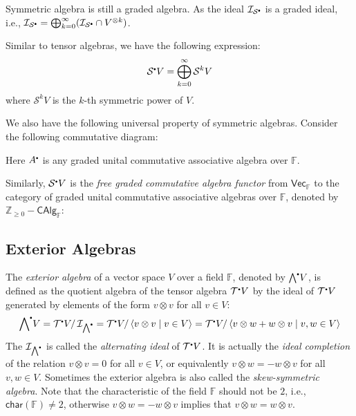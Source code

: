 \documentclass[
	11pt, %
	fleqn, %
	a4paper, %
]{LegrandOrangeBook}
\newcommand{\smallbullet}{\scalebox{0.5}{$\bullet$}}
\renewcommand{\bar}[1]{\overline{#1}} %
\newcommand{\quotient}[2]{#1/\, #2} %
\newcommand{\F}{\mathbb{F}} %
\newcommand{\Vect}{\boldsymbol{\mathsf{Vec}}} %
\newcommand{\T}{\mathcal{T}^{\smallbullet}} %
\newcommand{\chart}{\mathsf{char}} %
\newcommand{\Sym}{\mathcal{S}^{\smallbullet}} %
\newcommand{\Ext}{{\bigwedge}^{\smallbullet}} %
\newcommand{\ideal}{\mathcal{I}} %
\newcommand{\Z}{\mathbb{Z}} %
\newcommand{\CAlg}{\boldsymbol{\mathsf{CAlg}}} %
\begin{document}
\begin{remark}
    Symmetric algebra is still a graded algebra. As the ideal $\ideal_{\Sym}$ is a graded ideal, i.e., $\ideal_{\Sym} = \bigoplus_{k = 0}^{\infty} (\ideal_{\Sym} \cap V^{\otimes k})$.
\end{remark}

Similar to tensor algebras, we have the following expression:
\[
    \Sym V = \bigoplus_{k = 0}^{\infty} \mathcal{S}^k V
\]
where $\mathcal{S}^k V$ is the $k$-th symmetric power of $V$.

We also have the following universal property of symmetric algebras. Consider the following commutative diagram:
\begin{center}
\end{center}
Here $A^{\smallbullet}$ is any graded unital commutative associative algebra over $\F$.

Similarly, $\Sym V$ is the \emph{free graded commutative algebra functor} from $\Vect_{\F}$ to the category of graded unital commutative associative algebras over $\F$, denoted by $\Z_{\geq 0} - \CAlg_{\F}$:

\subsection{Exterior Algebras}

The \emph{exterior algebra} of a vector space $V$ over a field $\F$, denoted by $\Ext V$, is defined as the quotient algebra of the tensor algebra $\T V$ by the ideal of $\T V$ generated by elements of the form $v \otimes v$ for all $v \in V$:
\[
    \Ext V = \quotient{\T V}{\ideal_{\Ext}} = \quotient{\T V}{\langle v \otimes v \mid v \in V \rangle} = \quotient{\T V}{\langle v \otimes w + w \otimes v \mid v, w \in V \rangle}
\]
The $\ideal_{\Ext}$ is called the \emph{alternating ideal} of $\T V$. It is actually the \emph{ideal completion} of the relation $v \otimes v = 0$ for all $v \in V$, or equivalently $v \otimes w = - w \otimes v$ for all $v, w \in V$. Sometimes the exterior algebra is also called the \emph{skew-symmetric algebra}. Note that the characteristic of the field $\F$ should not be $2$, i.e., $\chart(\F) \neq 2$, otherwise $v \otimes w = - w \otimes v$ implies that $v \otimes w = w \otimes v$.
\end{document}
